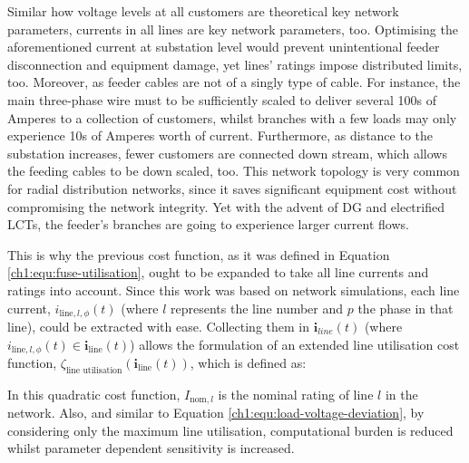 Similar how voltage levels at all customers are theoretical key network parameters, currents in all lines are key network parameters, too.
Optimising the aforementioned current at substation level would prevent unintentional feeder disconnection and equipment damage, yet lines' ratings impose distributed limits, too.
Moreover, as feeder cables are not of a singly type of cable.
For instance, the main three-phase wire must to be sufficiently scaled to deliver several 100s of Amperes to a collection of customers, whilst branches with a few loads may only experience 10s of Amperes worth of current.
Furthermore, as distance to the substation increases, fewer customers are connected down stream, which allows the feeding cables to be down scaled, too.
This network topology is very common for radial distribution networks, since it saves significant equipment cost without compromising the network integrity.
Yet with the advent of DG and electrified LCTs, the feeder's branches are going to experience larger current flows.


This is why the previous cost function, as it was defined in Equation \ref{ch1:equ:fuse-utilisation}, ought to be expanded to take all line currents and ratings into account.
Since this work was based on network simulations, each line current, $i_{\text{line},l,\phi}(t)$ (where $l$ represents the line number and $p$ the phase in that line), could be extracted with ease.
Collecting them in $\textbf{i}_{line}(t)$ (where $i_{\text{line},l,\phi}(t) \in \textbf{i}_\text{line}(t)$) allows the formulation of an extended line utilisation cost function, $\zeta_\text{line utilisation}(\textbf{i}_\text{line}(t))$, which is defined as:



In this quadratic cost function, $I_{\text{nom},l}$ is the nominal rating of line $l$ in the network.
Also, and similar to Equation \ref{ch1:equ:load-voltage-deviation}, by considering only the maximum line utilisation, computational burden is reduced whilst parameter dependent sensitivity is increased.

